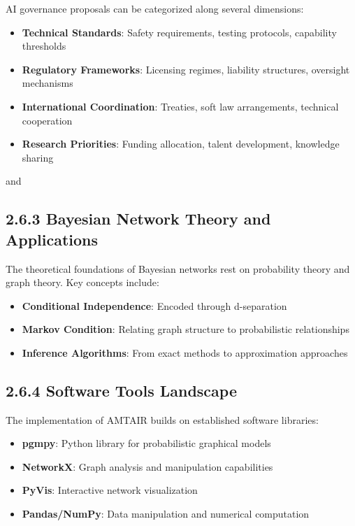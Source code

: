 \documentclass[
  11pt,
  letterpaper,
]{book}
\providecommand{\tightlist}{%
  \setlength{\itemsep}{0pt}\setlength{\parskip}{0pt}}
\begin{document}
AI governance proposals can be categorized along several dimensions:

\begin{itemize}
\tightlist
\item
  \textbf{Technical Standards}: Safety requirements, testing protocols,
  capability thresholds
\item
  \textbf{Regulatory Frameworks}: Licensing regimes, liability
  structures, oversight mechanisms
\item
  \textbf{International Coordination}: Treaties, soft law arrangements,
  technical cooperation
\item
  \textbf{Research Priorities}: Funding allocation, talent development,
  knowledge sharing
\end{itemize}

\textcite{dafoe2021} and \textcite{dafoe2018}

\textcite{miotti2024}

\subsection*{2.6.3 Bayesian Network Theory and
Applications}\label{sec-bn-theory}

The theoretical foundations of Bayesian networks rest on probability
theory and graph theory. Key concepts include:

\begin{itemize}
\tightlist
\item
  \textbf{Conditional Independence}: Encoded through d-separation
\item
  \textbf{Markov Condition}: Relating graph structure to probabilistic
  relationships
\item
  \textbf{Inference Algorithms}: From exact methods to approximation
  approaches
\end{itemize}

\textcite{koller2009}

\subsection*{2.6.4 Software Tools Landscape}\label{sec-software-tools}

The implementation of AMTAIR builds on established software libraries:

\begin{itemize}
\tightlist
\item
  \textbf{pgmpy}: Python library for probabilistic graphical models
\item
  \textbf{NetworkX}: Graph analysis and manipulation capabilities
\item
  \textbf{PyVis}: Interactive network visualization
\item
  \textbf{Pandas/NumPy}: Data manipulation and numerical computation
\end{itemize}
\end{document}
